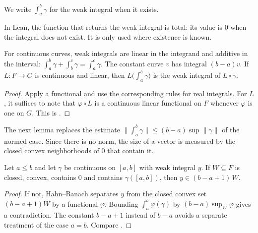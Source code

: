 We write $\int_a^b \gamma$ for the weak integral when it exists.

\begin{remark}
  In Lean, the function that returns the weak integral is total: its value is $0$ when the
  integral does not exist. It is only used where existence is known.
\end{remark}

\begin{lemma}
  \label{lem:weak-integral-algebra}
  \leanok
  For continuous curves, weak integrals are linear in the integrand and additive in the
  interval: $\int_a^b \gamma + \int_b^c \gamma = \int_a^c \gamma$. The constant curve $v$ has
  integral $(b - a)v$. If $L \colon F \to G$ is continuous and linear, then
  $L\bigl(\int_a^b \gamma\bigr)$ is the weak integral of $L \circ \gamma$.
\end{lemma}

\begin{proof}
  \leanok
  Apply a functional and use the corresponding rules for real integrals. For $L$, it suffices
  to note that $\varphi \circ L$ is a continuous linear functional on $F$ whenever $\varphi$ is
  one on $G$. This is \cite[1.1.4 and 1.1.8]{GN26}.
\end{proof}

The next lemma replaces the estimate $\|\int_a^b \gamma\| \leq (b - a) \sup \|\gamma\|$ of
the normed case. Since there is no norm, the size of a vector is measured by the closed convex
neighborhoods of $0$ that contain it.

\begin{lemma}
  \label{lem:weak-integral-small}
  \leanok
  Let $a \leq b$ and let $\gamma$ be continuous on $[a, b]$ with weak integral $y$. If
  $W \subseteq F$ is closed, convex, contains $0$ and contains $\gamma([a, b])$, then
  $y \in (b - a + 1)\, W$.
\end{lemma}

\begin{proof}
  \leanok
  If not, Hahn--Banach separates $y$ from the closed convex set $(b - a + 1)W$ by a functional
  $\varphi$. Bounding $\int_a^b \varphi(\gamma)$ by $(b - a)\sup_W \varphi$ gives a
  contradiction. The constant $b - a + 1$ instead of $b - a$ avoids a separate treatment of
  the case $a = b$. Compare \cite[1.1.9]{GN26}.
\end{proof}

